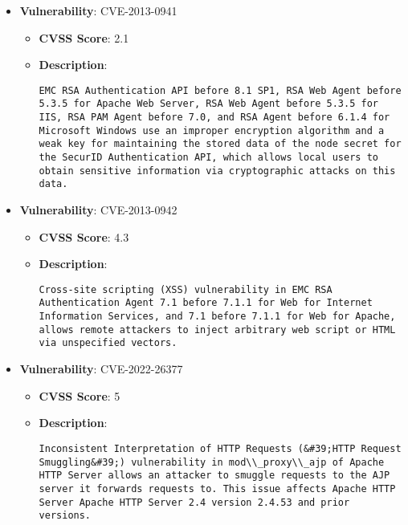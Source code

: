 \documentclass{article}
\begin{document}
\begin{itemize}
        \item \textbf{Vulnerability}: CVE-2013-0941
        \begin{itemize}
            \item \textbf{CVSS Score}:  2.1 
            \item \textbf{Description}:
            \parbox[t]{0.9\linewidth}{
                \verb|EMC RSA Authentication API before 8.1 SP1, RSA Web Agent before 5.3.5 for Apache Web Server, RSA Web Agent before 5.3.5 for IIS, RSA PAM Agent before 7.0, and RSA Agent before 6.1.4 for Microsoft Windows use an improper encryption algorithm and a weak key for maintaining the stored data of the node secret for the SecurID Authentication API, which allows local users to obtain sensitive information via cryptographic attacks on this data.|
            }
        \end{itemize}
    
        \item \textbf{Vulnerability}: CVE-2013-0942
        \begin{itemize}
            \item \textbf{CVSS Score}:  4.3 
            \item \textbf{Description}:
            \parbox[t]{0.9\linewidth}{
                \verb|Cross-site scripting (XSS) vulnerability in EMC RSA Authentication Agent 7.1 before 7.1.1 for Web for Internet Information Services, and 7.1 before 7.1.1 for Web for Apache, allows remote attackers to inject arbitrary web script or HTML via unspecified vectors.|
            }
        \end{itemize}
    
        \item \textbf{Vulnerability}: CVE-2022-26377
        \begin{itemize}
            \item \textbf{CVSS Score}:  5 
            \item \textbf{Description}:
            \parbox[t]{0.9\linewidth}{
                \verb|Inconsistent Interpretation of HTTP Requests (&#39;HTTP Request Smuggling&#39;) vulnerability in mod\\_proxy\\_ajp of Apache HTTP Server allows an attacker to smuggle requests to the AJP server it forwards requests to. This issue affects Apache HTTP Server Apache HTTP Server 2.4 version 2.4.53 and prior versions.|
            }
        \end{itemize}
    

\end{itemize}
\end{document}
